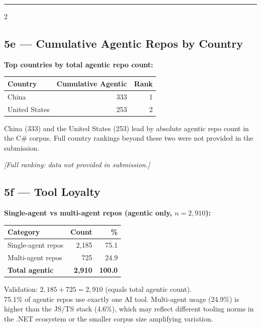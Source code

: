 \documentclass[10pt,a4paper]{article}
\begin{document}
\vspace{4pt}
\hrule
\vspace{4pt}

\begin{multicols}{2}
\footnotesize

\subsection*{5e --- Cumulative Agentic Repos by Country}

\textbf{Top countries by total agentic repo count:}

\vspace{2pt}
\begin{tabular}{@{}lrr@{}}
\toprule
Country & Cumulative Agentic & Rank \\
\midrule
China          & 333 & 1 \\
United States  & 253 & 2 \\
\bottomrule
\end{tabular}

\vspace{2pt}
{\small China (333) and the United States (253) lead by absolute agentic
repo count in the C\# corpus. Full country rankings beyond these two were
not provided in the submission.}

\textit{\small [Full ranking: data not provided in submission.]}

\columnbreak

\subsection*{5f --- Tool Loyalty}

\textbf{Single-agent vs multi-agent repos (agentic only, $n=2{,}910$):}

\vspace{2pt}
\begin{tabular}{@{}lrr@{}}
\toprule
Category & Count & \% \\
\midrule
Single-agent repos & 2,185 & 75.1 \\
Multi-agent repos  &   725 & 24.9 \\
\midrule
\textbf{Total agentic} & \textbf{2,910} & \textbf{100.0} \\
\bottomrule
\end{tabular}

\vspace{2pt}
{\small Validation: $2{,}185 + 725 = 2{,}910$ \checkmark (equals total agentic count).\\
75.1\% of agentic repos use exactly one AI tool.
Multi-agent usage (24.9\%) is higher than the JS/TS stack (4.6\%),
which may reflect different tooling norms in the .NET ecosystem or
the smaller corpus size amplifying variation.}

\end{multicols}
\end{document}
